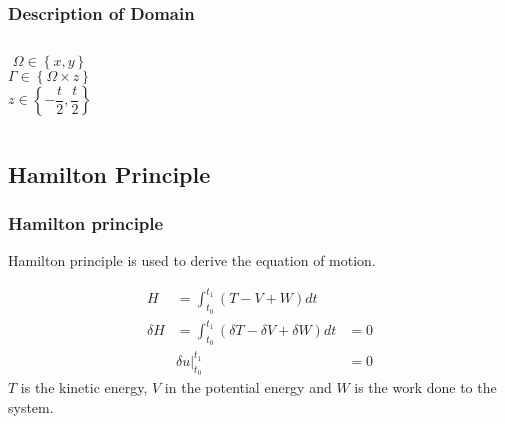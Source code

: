 \documentclass[9pt]{beamer}
\begin{document}
\begin{frame}
\frametitle{Description of Domain}

\begin{figure}[h!]
\centering

\end{figure}
\begin{columns}

\begin{equation*}
\Omega \in \left\{ x, y \right\}
\end{equation*}
\begin{equation*}
\Gamma \in \left\{ \Omega \times z \right\}
\end{equation*}
\begin{equation*}
z \in \left\{ -\frac{t}{2}, \frac{t}{2} \right\}
\end{equation*}
\end{columns}

\end{frame}

\subsection{Hamilton Principle}
\begin{frame}
\frametitle{Hamilton principle}
Hamilton principle is used to derive the equation of motion. 
 
 \begin{align*}
H & = \int_{t_0}^{t_1} \left( T - V + W \right) dt &  \\
 \delta H & =  \int_{t_0}^{t_1} \left( \delta T - \delta V + \delta W \right) dt   &  =  0 
\\
 &\delta u \Big|_{t_0}^{t_1}& = 0
 \end{align*}
 $T$ is the kinetic energy, $V$ in the potential energy and $W$ is the work done to the system.
 
\end{frame}
\end{document}
